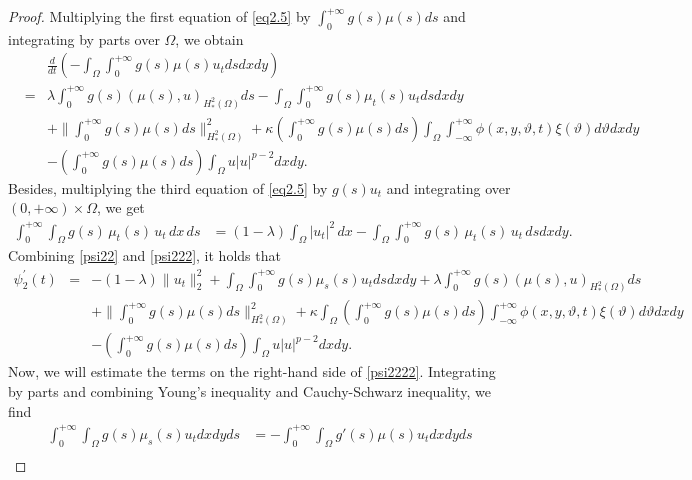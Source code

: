 \documentclass[12pt]{article}
\numberwithin{equation}{section}
\begin{document}
\begin{proof}
Multiplying the first equation of \eqref{eq2.5} by $\displaystyle\int_{0}^{+\infty} g(s) \mu(s) ds$ and integrating by parts over $\Omega$, we obtain
\begin{eqnarray}\label{psi22}
&&\frac{d}{dt}\left( - \int_{\Omega} \int_{0}^{+\infty}g(s)\mu(s)u_{t}ds dx dy \right)\nonumber\\
&=&\lambda \int_{0}^{+\infty}g(s)(\mu(s), u)_{H^2_*(\Omega)}ds- \int_{\Omega} \int_{0}^{+\infty}g(s)\mu_{t}(s)u_{t}ds dx dy \nonumber\\
&&+ \Big\|\int_{0}^{+\infty} g(s)\mu(s)ds\Big\|^2_{H^2_*(\Omega)}+ \kappa \left( \int_{0}^{+\infty} g(s)\mu(s)ds\right)\int_{\Omega} \int_{-\infty}^{+\infty}
\phi(x,y,\vartheta,t)\xi(\vartheta)d\vartheta dx dy \nonumber\\
&&- \left( \int_{0}^{+\infty} g(s)\mu(s)ds \right)\int_{\Omega} u|u|^{p-2}dx dy.
\end{eqnarray}
Besides, multiplying the third equation of \eqref{eq2.5} by  $g(s)u_{t}$ and integrating over  $(0,+\infty)\times \Omega$, we get
\begin{align}\label{psi222}
\int_{0}^{+\infty} \int_{\Omega} g(s)\,\mu_{t}(s)\,u_{t}\,dx\,ds
&= (1-\lambda)\int_{\Omega} |u_{t}|^{2}\,dx
   - \int_{\Omega} \int_{0}^{+\infty} g(s)\,\mu_{t}(s)\,u_{t}\,ds dx dy.
\end{align}
Combining \eqref{psi22} and \eqref{psi222}, it holds that
\begin{eqnarray}\label{psi2222}
\psi^{\prime}_{2}(t)&=& -(1-\lambda)\|u_{t}\|_{2}^{2}
 + \int_{\Omega} \int_{0}^{+\infty} g(s)\mu_{s}(s)u_{t} ds dx dy
 + \lambda \int_{0}^{+\infty}g(s)(\mu(s), u)_{H^2_*(\Omega)} ds \nonumber\\
&&+ \Big\|
     \int_{0}^{+\infty} g(s)\mu(s)ds
   \Big\|^2_{H^2_*(\Omega)}
 + \kappa\displaystyle\int_\Omega\left( \int_{0}^{+\infty} g(s)\mu(s)ds \right)
     \int_{-\infty}^{+\infty}
        \phi(x,y,\vartheta,t)\xi(\vartheta)d\vartheta dx dy \nonumber\\
&&- \left( \int_{0}^{+\infty} g(s)\mu(s)ds \right)
   \int_{\Omega} u|u|^{p-2} dx dy.
\end{eqnarray}
Now, we will estimate the terms on the right-hand side of \eqref{psi2222}.
Integrating by parts and combining Young's inequality and Cauchy-Schwarz inequality, we find
\begin{align}\label{psi2^5}
\int_{0}^{+\infty} \int_{\Omega} g(s)\mu_{s}(s)u_{t}dx dy ds
&= - \int_{0}^{+\infty} \int_{\Omega} g'(s)\mu(s)u_{t}dx dy ds \nonumber\\

\end{align}
\end{proof}
\end{document}
